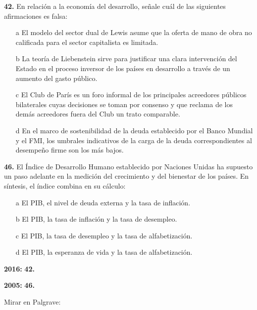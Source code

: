 \documentclass{nuevotema}
\begin{document}
\preguntas

\textbf{42.} En relación a la economía del desarrollo, señale cuál de las siguientes afirmaciones es falsa:
\begin{enumerate}
	\item[a] El modelo del sector dual de Lewis asume que la oferta de mano de obra no calificada para el sector capitalista es limitada.
	\item[b] La teoría de Liebenstein sirve para justificar una clara intervención del Estado en el proceso inversor de los países en desarrollo a través de un aumento del gasto público.
	\item[c] El Club de París es un foro informal de los principales acreedores públicos bilaterales cuyas decisiones se toman por consenso y que reclama de los demás acreedores fuera del Club un trato comparable.
	\item[d] En el marco de sostenibilidad de la deuda establecido por el Banco Mundial y el FMI, los umbrales indicativos de la carga de la deuda correspondientes al desempeño firme son los más bajos.
\end{enumerate}

\textbf{46.} El Índice de Desarrollo Humano establecido por Naciones Unidas ha supuesto un paso adelante en la medición del crecimiento y del bienestar de los países. En síntesis, el índice combina en su cálculo:
\begin{enumerate}
	\item[a] El PIB, el nivel de deuda externa y la tasa de inflación.
	\item[b] El PIB, la tasa de inflación y la tasa de desempleo.
	\item[c] El PIB, la tasa de desempleo y la tasa de alfabetización.
	\item[d] El PIB, la esperanza de vida y la tasa de alfabetización.
\end{enumerate}


\notas

\textbf{2016:} \textbf{42.}

\textbf{2005:} \textbf{46.}

\bibliografia

Mirar en Palgrave:
\end{document}
